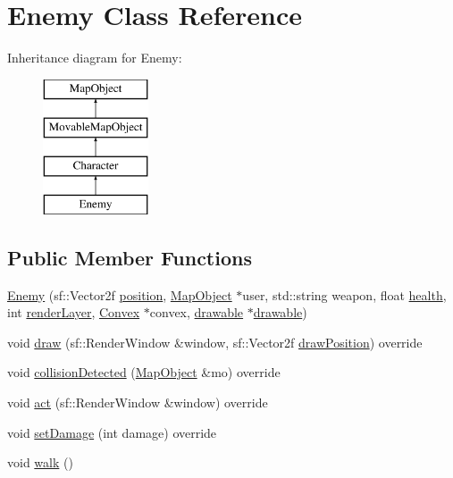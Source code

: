 \hypertarget{class_enemy}{}\section{Enemy Class Reference}
\label{class_enemy}
Inheritance diagram for Enemy\+:\begin{figure}[H]
\begin{center}
\leavevmode
\includegraphics[height=4.000000cm]{class_enemy}
\end{center}
\end{figure}
\subsection*{Public Member Functions}
\begin{DoxyCompactItemize}
\item 
\hyperlink{class_enemy_ab38bcd07b4b6d46b42186b15937bd89a}{Enemy} (sf\+::\+Vector2f \hyperlink{class_map_object_a00491cbf8e4cbc729ef37e11f3473860}{position}, \hyperlink{class_map_object}{Map\+Object} $\ast$user, std\+::string weapon, float \hyperlink{class_character_afb656d9f04bf30095c37cc54749f046e}{health}, int \hyperlink{class_map_object_ac7431860a4ca955dc3db173926be3856}{render\+Layer}, \hyperlink{class_convex}{Convex} $\ast$convex, \hyperlink{classdrawable}{drawable} $\ast$\hyperlink{classdrawable}{drawable})
\item 
void \hyperlink{class_enemy_af43b53feca4cdac652261157aa83a6c1}{draw} (sf\+::\+Render\+Window \&window, sf\+::\+Vector2f \hyperlink{class_map_object_a3f383fa967b67989a1d30f8f9ff73936}{draw\+Position}) override
\item 
void \hyperlink{class_enemy_af173241ce46853b2e325202baee4647e}{collision\+Detected} (\hyperlink{class_map_object}{Map\+Object} \&mo) override
\item 
void \hyperlink{class_enemy_a19c73a7553fe3cfc92f4b8aff03a403f}{act} (sf\+::\+Render\+Window \&window) override
\item 
void \hyperlink{class_enemy_aeabdbc13e40d729992af9612c6b586be}{set\+Damage} (int damage) override
\item 
void \hyperlink{class_enemy_a227e2a7f07734542c91990395728677a}{walk} ()
\end{DoxyCompactItemize}
